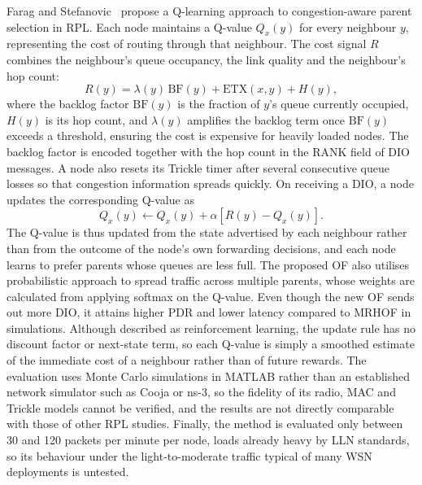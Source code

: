 Farag and Stefanovic~\cite{faragCongestionAwareRoutingDynamic2021}
propose a Q-learning approach to congestion-aware parent selection in
RPL. Each node maintains a Q-value $Q_x(y)$ for every neighbour $y$,
representing the cost of routing through that neighbour. The cost
signal $R$ combines the neighbour's queue occupancy, the link quality and
the neighbour's hop count:
\begin{equation}
    R(y) = \lambda(y)\,\mathrm{BF}(y) + \mathrm{ETX}(x,y) + H(y),
\end{equation}
where the backlog factor $\mathrm{BF}(y)$ is the fraction of $y$'s
queue currently occupied, $H(y)$ is its hop count, and $\lambda(y)$
amplifies the backlog term once $\mathrm{BF}(y)$ exceeds a threshold,
ensuring the cost is expensive for heavily loaded nodes.
The backlog factor is encoded together with the hop count in the RANK
field of DIO messages. A node also resets its Trickle timer after
several consecutive queue
losses so that congestion information spreads quickly. On receiving
a DIO, a node updates the corresponding Q-value as
\begin{equation}
    Q_x(y) \leftarrow Q_x(y) + \alpha \left[ R(y) - Q_x(y) \right].
\end{equation}
The Q-value is thus updated from the state advertised by each
neighbour rather than from the outcome of the node's own forwarding
decisions, and each node learns to prefer parents whose queues are
less full.
The proposed OF also utilises probabilistic approach to spread
traffic across multiple parents, whose weights are calculated from
applying softmax on the Q-value.
Even though the new OF sends out more DIO, it attains higher PDR and
lower latency compared to MRHOF in simulations.
Although described as reinforcement learning, the update
rule has no discount factor or next-state term, so each Q-value is
simply a smoothed estimate of the immediate cost of a neighbour
rather than of future rewards. The evaluation uses
Monte Carlo simulations in MATLAB rather than an established network
simulator such as Cooja or ns-3, so the fidelity of its radio, MAC
and Trickle models cannot be verified, and the results are not
directly comparable with those of other RPL studies. Finally, the
method is evaluated only between 30 and 120 packets per minute per
node, loads already heavy by LLN standards, so its behaviour under
the light-to-moderate traffic typical of many WSN deployments is
untested.

